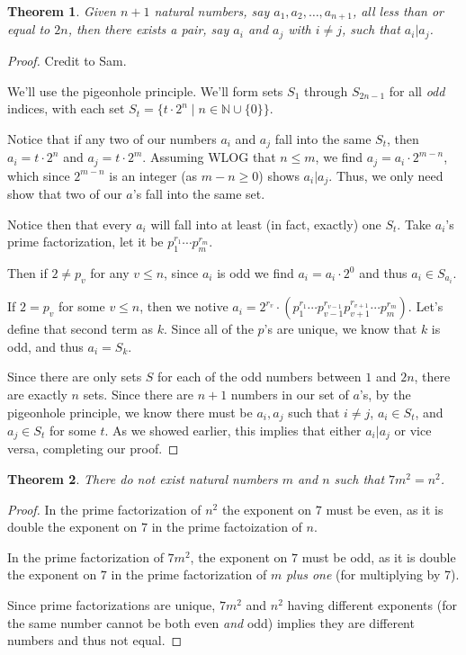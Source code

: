 \documentclass{article}
\newtheorem{thm}{Theorem}[section]
\numberwithin{equation}{thm}
\begin{document}
\pagebreak



\begin{thm} \label{2.18}
  Given $n+1$ natural numbers, say $a_1, a_2, \ldots, a_{n+1}$, all less than or equal to $2n$, then there exists a pair, say $a_i$ and $a_j$ with $i \neq j$, such that $a_i | a_j$.
\end{thm}

\begin{proof}
  Credit to Sam.

  We'll use the pigeonhole principle. We'll form sets $S_1$ through $S_{2n-1}$ for all \emph{odd} indices, with each set $S_t = \{t \cdot 2^n \mid n \in \mathbb{N} \cup \{ 0\} \}$.

  Notice that if any two of our numbers $a_i$ and $a_j$ fall into the same $S_t$, then $a_i = t \cdot 2^{n}$ and $a_j = t \cdot 2^{m}$. Assuming WLOG that $n \leq m$, we find $a_j = a_i \cdot 2^{m-n}$, which since $2^{m-n}$ is an integer (as $m - n \geq 0$) shows $a_i | a_j$. Thus, we only need show that two of our $a$'s fall into the same set.

  Notice then that every $a_i$ will fall into at least (in fact, exactly) one $S_t$. Take $a_i$'s prime factorization, let it be $p_1^{r_1} \cdots p_m^{r_m}$.

  Then if $2 \neq p_v$ for any $v \leq n$, since $a_i$ is odd we find $a_i = a_i \cdot 2^{0}$ and thus $a_i \in S_{a_i}$.

  If $2 = p_v$ for some $v \leq n$, then we notive $a_i = 2^{r_v} \cdot (p_1^{r_1} \cdots p_{v-1}^{r_{v-1}} p_{v+1}^{r_{v+1}} \cdots p_m^{r_m})$. Let's define that second term as $k$. Since all of the $p$'s are unique, we know that $k$ is odd, and thus $a_i = S_{k}$.

  Since there are only sets $S$ for each of the odd numbers between $1$ and $2n$, there are exactly $n$ sets. Since there are $n+1$ numbers in our set of $a$'s, by the pigeonhole principle, we know there must be $a_i, a_j$ such that $i \neq j$, $a_i \in S_t$, and $a_j \in S_t$ for some $t$. As we showed earlier, this implies that either $a_i | a_j$ or vice versa, completing our proof.
\end{proof}



\begin{thm} \label{2.19}
  There do not exist natural numbers $m$ and $n$ such that $7m^2 = n^2$.
\end{thm}

\begin{proof}
  In the prime factorization of $n^2$ the exponent on $7$ must be even, as it is double the exponent on $7$ in the prime factoization of $n$.

  In the prime factorization of $7m^2$, the exponent on $7$ must be odd, as it is double the exponent on $7$ in the prime factorization of $m$ \emph{plus one} (for multiplying by 7).

  Since prime factorizations are unique, $7m^2$ and $n^2$ having different exponents (for the same number cannot be both even \emph{and} odd) implies they are different numbers and thus not equal.
\end{proof}
\end{document}
